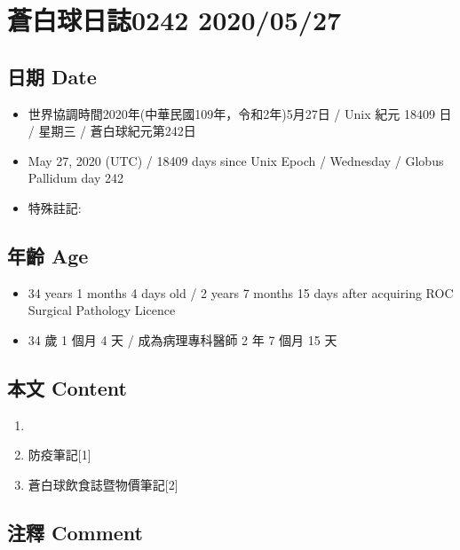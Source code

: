\documentclass[
]{article}
\providecommand{\tightlist}{%
  \setlength{\itemsep}{0pt}\setlength{\parskip}{0pt}}
\begin{document}
\hypertarget{ux84bcux767dux7403ux65e5ux8a8c0242-20200527}{%
\section{蒼白球日誌0242
2020/05/27}\label{ux84bcux767dux7403ux65e5ux8a8c0242-20200527}}

\hypertarget{ux65e5ux671f-date-26}{%
\subsection{日期 Date}\label{ux65e5ux671f-date-26}}

\begin{itemize}
\tightlist
\item
  世界協調時間2020年(中華民國109年，令和2年)5月27日 / Unix 紀元 18409 日
  / 星期三 / 蒼白球紀元第242日
\item
  May 27, 2020 (UTC) / 18409 days since Unix Epoch / Wednesday / Globus
  Pallidum day 242
\item
  特殊註記:
\end{itemize}

\hypertarget{ux5e74ux9f61-age-26}{%
\subsection{年齡 Age}\label{ux5e74ux9f61-age-26}}

\begin{itemize}
\tightlist
\item
  34 years 1 months 4 days old / 2 years 7 months 15 days after
  acquiring ROC Surgical Pathology Licence
\item
  34 歲 1 個月 4 天 / 成為病理專科醫師 2 年 7 個月 15 天
\end{itemize}

\hypertarget{ux672cux6587-content-26}{%
\subsection{本文 Content}\label{ux672cux6587-content-26}}

\begin{enumerate}
\def\labelenumi{\arabic{enumi}.}
\item
\item
  防疫筆記{[}1{]}
\item
  蒼白球飲食誌暨物價筆記{[}2{]}
\end{enumerate}

\hypertarget{ux6ce8ux91cb-comment-26}{%
\subsection{注釋 Comment}\label{ux6ce8ux91cb-comment-26}}
\end{document}
